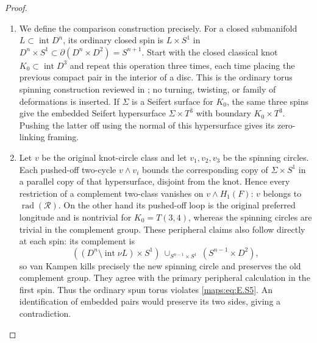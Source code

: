 \begin{proof}
\begin{enumerate}[label={$\langle1\rangle$\arabic*.},leftmargin=*]
\item We define the comparison construction precisely. For a closed
submanifold $L\subset\operatorname{int}D^n$, its ordinary closed
spin is $L\times S^1$ in
$D^n\times S^1\subset\partial(D^n\times D^2)=S^{n+1}$.
Start with the closed classical knot $K_0\subset\operatorname{int}D^3$
and repeat this operation three times, each time placing the
previous compact pair in the interior of a disc. This is the
ordinary torus spinning construction reviewed in
\cite[Section 3, immediately before Theorem 3.4]{mapsWinter08};
no turning, twisting, or family of deformations is inserted.
If $\Sigma$ is a Seifert surface for $K_0$, the same three spins
give the embedded Seifert hypersurface
$\Sigma\times T^3$ with boundary $K_0\times T^3$.
Pushing the latter off using the normal of this hypersurface
gives its zero-linking framing.

\item Let $v$ be the original knot-circle class and let $v_1,v_2,v_3$
be the spinning circles. Each pushed-off two-cycle $v\wedge v_i$
bounds the corresponding copy of $\Sigma\times S^1$ in a parallel
copy of that hypersurface, disjoint from the knot. Hence every
restriction of a complement two-class vanishes on $v\wedge H_1(F)$:
$v$ belongs to $\operatorname{rad}(\mathcal R)$.
On the other hand its pushed-off loop is the original preferred
longitude and is nontrivial for $K_0=T(3,4)$, whereas the spinning
circles are trivial in the complement group. These peripheral
claims also follow directly at each spin: its complement is
\[
 ((D^n\setminus\operatorname{int}\nu L)\times S^1)
       \ \cup_{S^{n-1}\times S^1}\ (S^{n-1}\times D^2),
\]
so van Kampen kills precisely the new spinning circle and preserves
the old complement group. They agree with the primary peripheral
calculation \cite[Theorem 4.5]{mapsWinter08} in the first spin.
Thus the ordinary spun torus violates \eqref{maps:eq:E.S5}. An identification
of embedded pairs would preserve its two sides, giving a
contradiction.


\end{enumerate}
\end{proof}
